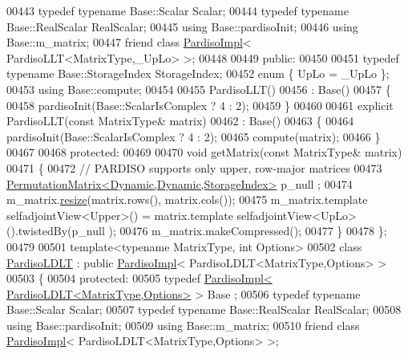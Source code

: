 \begin{DoxyCode}
00443     \textcolor{keyword}{typedef} \textcolor{keyword}{typename} Base::Scalar Scalar;
00444     \textcolor{keyword}{typedef} \textcolor{keyword}{typename} Base::RealScalar RealScalar;
00445     \textcolor{keyword}{using} Base::pardisoInit;
00446     \textcolor{keyword}{using} Base::m\_matrix;
00447     \textcolor{keyword}{friend} \textcolor{keyword}{class }\hyperlink{class_eigen_1_1_pardiso_impl}{PardisoImpl}< PardisoLLT<MatrixType,\_UpLo> >;
00448 
00449   \textcolor{keyword}{public}:
00450 
00451     \textcolor{keyword}{typedef} \textcolor{keyword}{typename} Base::StorageIndex StorageIndex;
00452     \textcolor{keyword}{enum} \{ UpLo = \_UpLo \};
00453     \textcolor{keyword}{using} Base::compute;
00454 
00455     PardisoLLT()
00456       : Base()
00457     \{
00458       pardisoInit(Base::ScalarIsComplex ? 4 : 2);
00459     \}
00460 
00461     \textcolor{keyword}{explicit} PardisoLLT(\textcolor{keyword}{const} MatrixType& matrix)
00462       : Base()
00463     \{
00464       pardisoInit(Base::ScalarIsComplex ? 4 : 2);
00465       compute(matrix);
00466     \}
00467     
00468   \textcolor{keyword}{protected}:
00469     
00470     \textcolor{keywordtype}{void} getMatrix(\textcolor{keyword}{const} MatrixType& matrix)
00471     \{
00472       \textcolor{comment}{// PARDISO supports only upper, row-major matrices}
00473       \hyperlink{group___core___module}{PermutationMatrix<Dynamic,Dynamic,StorageIndex>} p\_null
      ;
00474       m\_matrix.\hyperlink{group___core___module_a0e0fda6e84d69e02432e4770359bb532}{resize}(matrix.rows(), matrix.cols());
00475       m\_matrix.template selfadjointView<Upper>() = matrix.template selfadjointView<UpLo>().twistedBy(p\_null
      );
00476       m\_matrix.makeCompressed();
00477     \}
00478 \};
00479 
00501 \textcolor{keyword}{template}<\textcolor{keyword}{typename} MatrixType, \textcolor{keywordtype}{int} Options>
00502 \textcolor{keyword}{class }\hyperlink{class_eigen_1_1_pardiso_l_d_l_t}{PardisoLDLT} : \textcolor{keyword}{public} \hyperlink{class_eigen_1_1_pardiso_impl}{PardisoImpl}< PardisoLDLT<MatrixType,Options> >
00503 \{
00504   \textcolor{keyword}{protected}:
00505     \textcolor{keyword}{typedef} \hyperlink{class_eigen_1_1_pardiso_impl}{PardisoImpl< PardisoLDLT<MatrixType,Options>} > Base
      ;
00506     \textcolor{keyword}{typedef} \textcolor{keyword}{typename} Base::Scalar Scalar;
00507     \textcolor{keyword}{typedef} \textcolor{keyword}{typename} Base::RealScalar RealScalar;
00508     \textcolor{keyword}{using} Base::pardisoInit;
00509     \textcolor{keyword}{using} Base::m\_matrix;
00510     \textcolor{keyword}{friend} \textcolor{keyword}{class }\hyperlink{class_eigen_1_1_pardiso_impl}{PardisoImpl}< PardisoLDLT<MatrixType,Options> >;

\end{DoxyCode}

